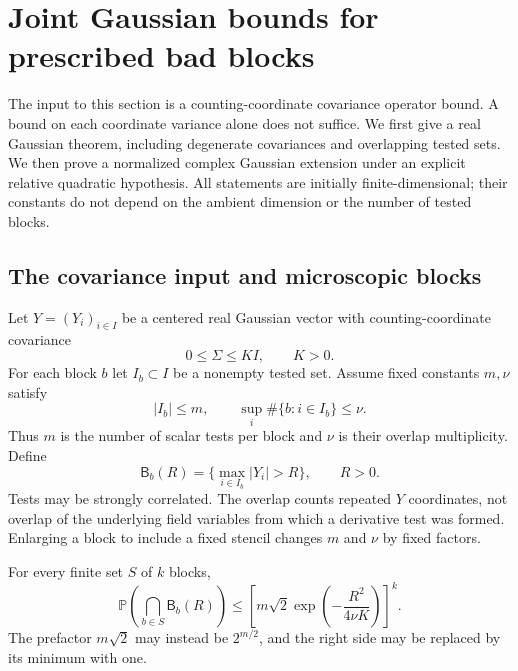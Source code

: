 
\section{Joint Gaussian bounds for prescribed bad blocks}
\label{jt-section}

The input to this section is a counting-coordinate covariance
operator bound. A bound on each coordinate variance alone does
not suffice. We first give a real Gaussian theorem, including
degenerate covariances and overlapping tested sets. We then prove
a normalized complex Gaussian extension under an explicit
relative quadratic hypothesis. All statements are initially
finite-dimensional; their constants do not depend on the ambient
dimension or the number of tested blocks.

\subsection{The covariance input and microscopic blocks}
\label{jt-input}

Let $Y=(Y_i)_{i\in I}$ be a centered real Gaussian vector with
counting-coordinate covariance
\begin{equation}\label{jt-covariance}
 0\le\Sigma\le K I,\qquad K>0.
\end{equation}
For each block $b$ let $I_b\subset I$ be a nonempty tested set.
Assume fixed constants $m,\nu$ satisfy
\begin{equation}\label{jt-incidence}
 |I_b|\le m,\qquad
 \sup_i\#\{b:i\in I_b\}\le\nu.
\end{equation}
Thus $m$ is the number of scalar tests per block and $\nu$ is
their overlap multiplicity. Define
\begin{equation}\label{jt-bad-event}
 \mathsf B_b(R)=\{\max_{i\in I_b}|Y_i|>R\},\qquad R>0.
\end{equation}
Tests may be strongly correlated. The overlap counts repeated
$Y$ coordinates, not overlap of the underlying field variables
from which a derivative test was formed. Enlarging a block to
include a fixed stencil changes $m$ and $\nu$ by fixed factors.

\begin{theorem}
\label{jt-real-theorem}
For every finite set $S$ of $k$ blocks,
\begin{equation}\label{jt-real-bound}
 \mathbb P\!\left(\bigcap_{b\in S}\mathsf B_b(R)\right)
 \le\left[
 m\sqrt2\exp\!\left(-\frac{R^2}{4\nu K}\right)
 \right]^k.
\end{equation}
The prefactor $m\sqrt2$ may instead be $2^{m/2}$, and the
right side may be replaced by its minimum with one.
\end{theorem}

